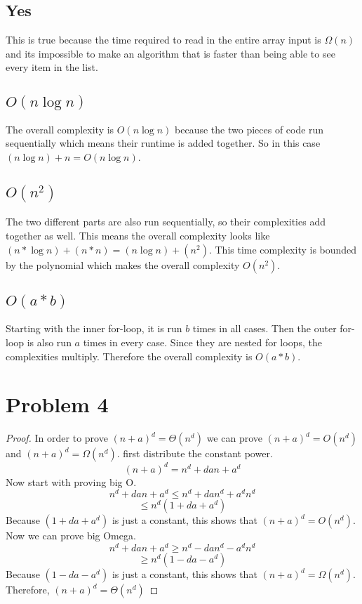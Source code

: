 \documentclass[11pt]{article}
\begin{document}
\subsection{Yes}
This is true because the time required to read in the entire array input is $\Omega{(n)}$ and its impossible to make
an algorithm that is faster than being able to see every item in the list.

\subsection{$O(n\log{n})$}
The overall complexity is $O(n\log{n})$ because the two pieces of code run sequentially which means their runtime
is added together. So in this case $(n\log{n}) + n = O(n\log{n})$.

\subsection{$O(n^{2})$}
The two different parts are also run sequentially, so their complexities add together as well. This means the overall
complexity looks like $(n * \log{n}) + (n * n) = (n\log{n}) + (n^{2})$. This time complexity is bounded by the polynomial
which makes the overall complexity $O(n^{2})$.

\subsection{$O(a * b)$}
Starting with the inner for-loop, it is run $b$ times in all cases. Then the outer for-loop is also run
$a$ times in every case. Since they are nested for loops, the complexities multiply. Therefore the overall
complexity is $O(a * b)$.

\section{Problem 4}
\begin{proof} In order to prove $(n + a)^{d} = \Theta{(n^{d})}$
we can prove $(n + a)^{d} = O(n^{d})$ and $(n + a)^{d} = \Omega{(n^{d})}$. first distribute the constant power.
\begin{equation*}
    (n + a)^{d} = n^{d} + dan + a^{d}
\end{equation*}
Now start with proving big O.
\begin{equation*}
    n^{d} + dan + a^{d} \le n^{d} + dan^d + a^{d}n^{d}
\end{equation*}
\begin{equation*}
    \le n^{d}(1 + da + a^{d})
\end{equation*}
Because $(1 + da + a^{d})$ is just a constant, this shows that $(n + a)^{d} = O(n^{d})$.
Now we can prove big Omega.
\begin{equation*}
    n^{d} + dan + a^{d} \ge n^{d} - dan^d - a^{d}n^{d}
\end{equation*}
\begin{equation*}
    \ge n^{d}(1 - da - a^{d})
\end{equation*}
Because $(1 - da - a^{d})$ is just a constant, this shows that $(n + a)^{d} = \Omega{(n^{d})}$.
Therefore, $(n + a)^{d} = \Theta{(n^{d})}$
\end{proof}
\end{document}
